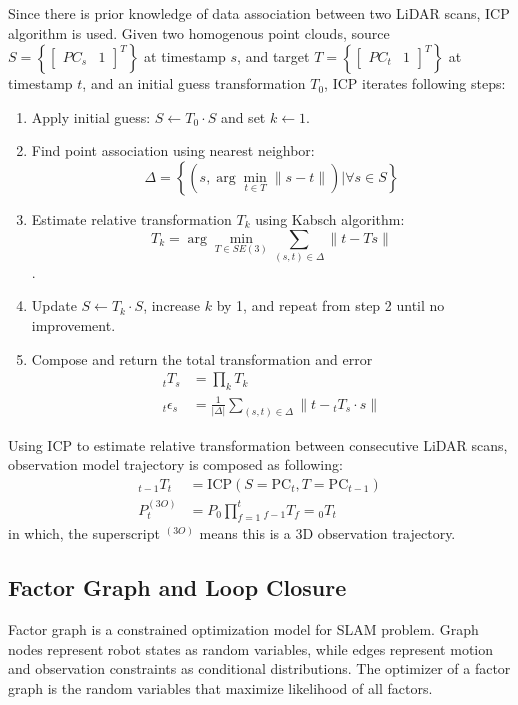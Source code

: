 \documentclass[conference]{IEEEtran}
\begin{document}
Since there is  prior knowledge of data association between two LiDAR scans,
ICP algorithm is used.
Given two homogenous point clouds, 
source $S = \left\{\left[ \begin{matrix}PC_{s}& 1\end{matrix} \right]^T \right\} $ at timestamp $s$,
and target $T = \left\{\left[ \begin{matrix}PC_{t}& 1\end{matrix} \right]^T \right\}$ at timestamp $t$,
and an initial guess transformation $T_0$,
ICP iterates following steps:
\begin{enumerate}
    \item Apply initial guess: $S \leftarrow T_0 \cdot S$ and set $k \leftarrow 1$.
    
    \item Find point association using nearest neighbor:
    $$ \Delta = \left\{\left(s, \arg\min_{t\in T} \|s - t\| \right) \bigg| \forall s\in S\right\}$$

    \item Estimate relative transformation $T_k$ using Kabsch algorithm:
    $$T_k = \arg\min_{T\in SE(3)} \sum\limits_{(s,t)\in\Delta} \|t - Ts\|$$.
    
    \item Update $S \leftarrow T_k \cdot S$, increase $k$ by 1, and repeat from step 2 until no improvement.

    \item Compose and return the total transformation and error 
    $$ \begin{aligned}
        {}_tT_s & = \prod_k T_k \\
        {}_t\epsilon_s &= \frac{1}{|\Delta|} \sum_{(s,t)\in\Delta} \|t - {}_tT_s\cdot s\| 
    \end{aligned}$$
\end{enumerate}


Using ICP to estimate relative transformation between consecutive LiDAR scans,
observation model trajectory is composed as following:
$$
\begin{aligned}
    _{t-1}T_{t}
        &=\text{ICP}(S=\mathrm{PC}_{t}, T=\mathrm{PC}_{t-1}) \\ 
    P^{(3O)}_{t}
        &=P_{0}\prod^{t}_{f=1} {}_{f-1}T_{f} = {}_{0}T_{t}
\end{aligned} 
$$
in which, the superscript $^{(3O)}$ means this is a 3D observation trajectory.

\subsection{Factor Graph and Loop Closure}
Factor graph is a constrained optimization model for SLAM problem.
Graph nodes represent robot states as random variables,
while edges represent motion and observation constraints as conditional distributions.
The optimizer of a factor graph is the random variables that maximize likelihood of all factors.
\end{document}
